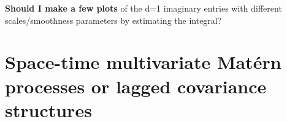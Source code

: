 \documentclass[11pt]{article}
\begin{document}
{\bf Should I make a few plots} of the d=1 imaginary entries with different scales/smoothness parameters by estimating the integral?

\section{Space-time multivariate Mat\'ern processes or lagged covariance structures}



\end{document}
